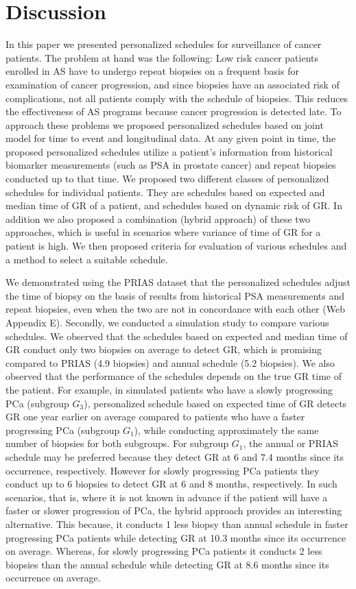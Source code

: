 
\section{Discussion}
\label{sec: discussion}
In this paper we presented personalized schedules for surveillance of cancer patients. The problem at hand was the following: Low risk cancer patients enrolled in AS have to undergo repeat biopsies on a frequent basis for examination of cancer progression, and since biopsies have an associated risk of complications, not all patients comply with the schedule of biopsies. This reduces the effectiveness of AS programs because cancer progression is detected late. To approach these problems we proposed personalized schedules based on joint model for time to event and longitudinal data. At any given point in time, the proposed personalized schedules utilize a patient's information from historical biomarker measurements (such as PSA in prostate cancer) and repeat biopsies conducted up to that time. We proposed two different classes of personalized schedules for individual patients. They are schedules based on expected and median time of GR of a patient, and schedules based on dynamic risk of GR. In addition we also proposed a combination (hybrid approach) of these two approaches, which is useful in scenarios where variance of time of GR for a patient is high. We then proposed criteria for evaluation of various schedules and a method to select a suitable schedule.

We demonstrated using the PRIAS dataset that the personalized schedules adjust the time of biopsy on the basis of results from historical PSA measurements and repeat biopsies, even when the two are not in concordance with each other (Web Appendix E). Secondly, we conducted a simulation study to compare various schedules. We observed that the schedules based on expected and median time of GR conduct only two biopsies on average to detect GR, which is promising compared to PRIAS (4.9 biopsies) and annual schedule (5.2 biopsies). We also observed that the performance of the schedules depends on the true GR time of the patient. For example, in simulated patients who have a slowly progressing PCa (subgroup $G_3$), personalized schedule based on expected time of GR detects GR one year earlier on average compared to patients who have a faster progressing PCa (subgroup $G_1$), while conducting approximately the same number of biopsies for both subgroups. For subgroup $G_1$, the annual or PRIAS schedule may be preferred because they detect GR at 6 and 7.4 months since its occurrence, respectively. However for slowly progressing PCa patients they conduct up to 6 biopsies to detect GR at 6 and 8 months, respectively. In such scenarios, that is, where it is not known in advance if the patient will have a faster or slower progression of PCa, the hybrid approach provides an interesting alternative. This because, it conducts 1 less biopsy than annual schedule in faster progressing PCa patients while detecting GR at 10.3 months since its occurrence on average. Whereas, for slowly progressing PCa patients it conducts 2 less biopsies than the annual schedule while detecting GR at 8.6 months since its occurrence on average.

